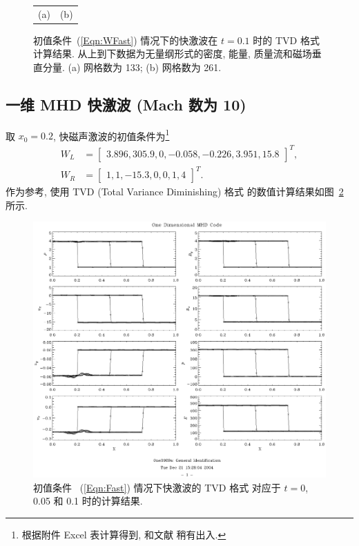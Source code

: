 \documentclass[10.5pt
]{article}
\begin{document}
\begin{figure}
\begin{center}
\begin{tabular}{cc}
\\
(a) & (b)
\end{tabular}
\caption{初值条件~(\ref{Eqn:WFast}) 情况下的快激波在 $t = 0.1$ 时的 TVD 格式 \citep{vanLeer1974,Harten1983} 计算结果. 从上到下数据为无量纲形式的密度, 能量, 质量流和磁场垂直分量.
  (a) 网格数为 133; (b) 网格数为 261.} \label{Fig:WFast}
\end{center}
\end{figure}

\subsection{一维 MHD 快激波 (Mach 数为 10)\citep{Dai1994}}
取 $x_0 = 0.2$, 快磁声激波的初值条件为\footnote{
  根据附件 Excel 表计算得到, 和文献 \citet{Dai1994} 稍有出入.
}
\begin{align}
W_L &= \left[\begin{array}{cccccc}
3.896,
305.9,
0,
-0.058,
-0.226,
3.951,
15.8
\end{array}\right]^T,
\nonumber\\
W_R &= \left[\begin{array}{ccccccc}
1,
1,
-15.3,
0,
0,
1,
4
\end{array}\right]^T.\label{Eqn:Fast}
\end{align}
作为参考, 使用 TVD (Total Variance Diminishing) 格式 \citep{vanLeer1974,Harten1983} 的数值计算结果如图~\ref{Fig:Fast} 所示.
\begin{figure}
\begin{center}
\includegraphics[height=.78\textwidth]{FShockNum.eps}
\caption{初值条件 ~(\ref{Eqn:Fast}) 情况下快激波的 TVD 格式 \citep{vanLeer1974,Harten1983} 对应于 $t=0$, 0.05 和 0.1 时的计算结果.}\label{Fig:Fast}
\end{center}
\end{figure}
\end{document}
